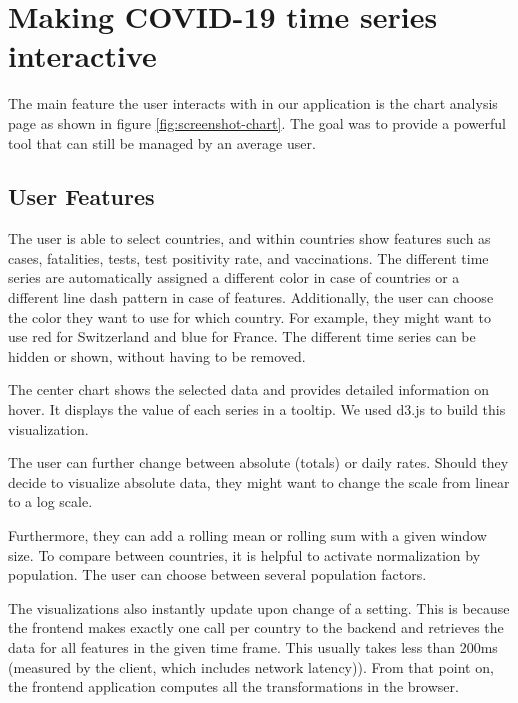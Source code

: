 \section{Making COVID-19 time series interactive}

The main feature the user interacts with in our application is the chart analysis page as shown in figure \ref{fig:screenshot-chart}. The goal was to provide a powerful tool that can still be managed by an average user.


\subsection{User Features}
The user is able to select countries, and within countries show features such as cases, fatalities, tests, test positivity rate, and vaccinations. The different time series are automatically assigned a different color in case of countries or a different line dash pattern in case of features. Additionally, the user can choose the color they want to use for which country. For example, they might want to use red for Switzerland and blue for France. The different time series can be hidden or shown, without having to be removed.

The center chart shows the selected data and provides detailed information on hover. It displays the value of each series in a tooltip. We used d3.js to build this visualization.

The user can further change between absolute (totals) or daily rates. Should they decide to visualize absolute data, they might want to change the scale from linear to a log scale.

Furthermore, they can add a rolling mean or rolling sum with a given window size. To compare between countries, it is helpful to activate normalization by population. The user can choose between several population factors.

The visualizations also instantly update upon change of a setting. This is because the frontend makes exactly one call per country to the backend and retrieves the data for all features in the given time frame. This usually takes less than 200ms (measured by the client, which includes network latency)). From that point on, the frontend application computes all the transformations in the browser.

